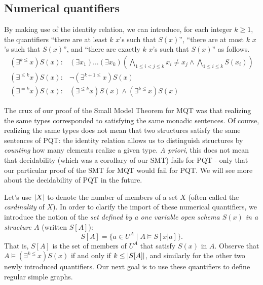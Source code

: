 \subsection*{Numerical quantifiers}
By making use of the identity relation, we can introduce, for each integer $k\geq 1$, the quantifiers ``there are at least $k$ $x$'s such that $S(x)$'', ``there are at most $k$ $x$'s such that $S(x)$'', and ``there are exactly  $k$ $x$'s such that $S(x)$'' as follows.
\[
\begin{array}{ll}
(\exists^{k\leq}x)S(x):  & (\exists x_1)\ldots(\exists x_k)(\bigwedge_{1\leq i<j\leq k}x_i\neq x_j\wedge \bigwedge_{1\leq i\leq k}S(x_i))\\
(\exists^{\leq k}x)S(x): & \neg (\exists^{k+1\leq}x)S(x)\\
(\exists^{ = k}x)S(x): & (\exists^{\leq k}x)S(x)\wedge(\exists^{k\leq}x)S(x)
\end{array}
\]

\begin{aside}
    The crux of our proof of the Small Model Theorem for MQT was that realizing the same types corresponded to satisfying the same monadic sentences. Of course, realizing the same types does not mean that two structures satisfy the same sentences of PQT: the identity relation allows us to distinguish structures by \emph{counting} how many elements realize a given type. \emph{A priori}, this does not mean that decidability (which was a corollary of our SMT) fails for PQT - only that our particular proof of the SMT for MQT would fail for PQT. We will see more about the decidability of PQT in the future. 
\end{aside}

Let's use $\mbox{$|X|$}$ to denote the number of members of a set $X$ (often called the \emph{cardinality} of $X$).    
In order to clarify the import of these  numerical quantifiers, we introduce the notion of the \emph{set defined by a one variable open schema $S(x)$ in a structure $A$} (written $S[A]$):
\[S[A]=\{a\in U^A\mid A\models S[x|a]\}.\] That is, $S[A]$ is the set of members of $U^A$ that satisfy $S(x)$ in $A$. Observe that $A\models(\exists^{k\leq}x)S(x)$ if and only if $k\leq\mbox{$|S[A]|$}$, and similarly for the other two newly introduced quantifiers. Our next goal is to use these quantifiers to define regular simple graphs.

